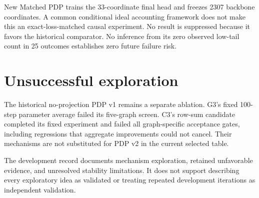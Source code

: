 New Matched PDP trains the 33-coordinate final head and freezes 2307 backbone coordinates. A common conditional ideal accounting framework does not make this an exact-loss-matched causal experiment. No result is suppressed because it favors the historical comparator. No inference from its zero observed low-tail count in 25 outcomes establishes zero future failure risk.

\section{Unsuccessful exploration}
The historical no-projection PDP v1 remains a separate ablation. G3's fixed 100-step parameter average failed its five-graph screen. C3's row-sum candidate completed its fixed experiment and failed all graph-specific acceptance gates, including regressions that aggregate improvements could not cancel. Their mechanisms are not substituted for PDP v2 in the current selected table.

The development record documents mechanism exploration, retained unfavorable evidence, and unresolved stability limitations. It does not support describing every exploratory idea as validated or treating repeated development iterations as independent validation.
